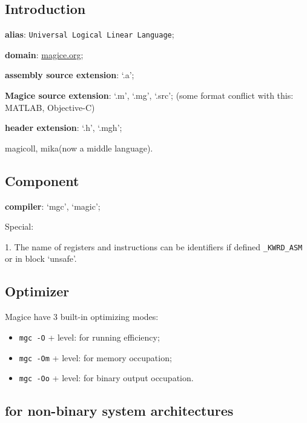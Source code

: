 
\subsection{Introduction}

\textbf{alias}: \texttt{Universal Logical Linear Language};

\textbf{domain}: \href{http://magice.org}{magice.org};

\textbf{assembly source extension}: `.a';

\textbf{Magice source extension}: `.m', `.mg', `.src'; (some format conflict with this: MATLAB, Objective-C)

\textbf{header extension}: `.h', `.mgh';

 magicoll, mika(now a middle language).

\subsection{Component}

\textbf{compiler}: `mgc', `magic';

Special:

1. The name of registers and instructions can be identifiers if defined \verb|_KWRD_ASM| or in block `unsafe'.

\subsection{Optimizer}

Magice have 3 built-in optimizing modes:

\begin{itemize}
\item \verb|mgc -O| + level: for running efficiency;
\item \verb|mgc -Om| + level: for memory occupation;
\item \verb|mgc -Oo| + level: for binary output occupation.
\end{itemize}

\subsection{for non-binary system architectures}
